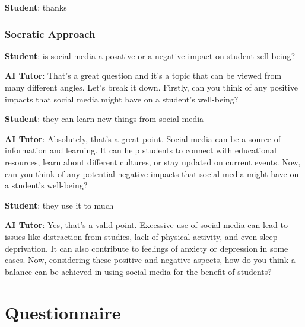 \documentclass[
  11pt,
]{article}
\begin{document}
\textbf{Student}: thanks

\subsubsection{Socratic Approach}\label{socratic-approach-1}

\textbf{Student}: is social media a posative or a negative impact on student zell being?

\textbf{AI Tutor}: That's a great question and it's a topic that can be viewed from many different angles. Let's break it down. Firstly, can you think of any positive impacts that social media might have on a student's well-being?

\textbf{Student}: they can learn new things from social media

\textbf{AI Tutor}: Absolutely, that's a great point. Social media can be a source of information and learning. It can help students to connect with educational resources, learn about different cultures, or stay updated on current events. Now, can you think of any potential negative impacts that social media might have on a student's well-being?

\textbf{Student}: they use it to much

\textbf{AI Tutor}: Yes, that's a valid point. Excessive use of social media can lead to issues like distraction from studies, lack of physical activity, and even sleep deprivation. It can also contribute to feelings of anxiety or depression in some cases. Now, considering these positive and negative aspects, how do you think a balance can be achieved in using social media for the benefit of students?

\newpage

\section{Questionnaire}\label{sec:questionnaire}
\end{document}
